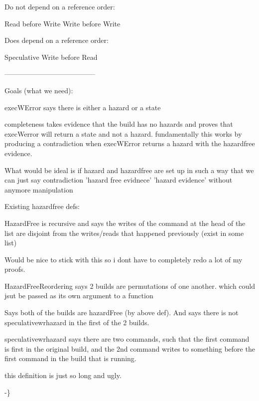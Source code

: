 \begin{code}[hide]
{Do not depend on a reference order:

   Read before Write
   Write before Write

Does depend on a reference order:
  
  Speculative Write before Read


---------------------------------------

Goals (what we need):

execWError says there is either a hazard or a state

completeness takes evidence that the build has no hazards and proves that execWerror will return 
a state and not a hazard.  fundamentally this works by producing a contradiction when execWError
returns a hazard with the hazardfree evidence. 

What would be ideal is if hazard and hazardfree are set up in such a way that we can just say
contradiction 'hazard free evidnece' 'hazard evidence' without anymore manipulation

Existing hazardfree defs:

HazardFree is recursive and says the writes of the command at the head of the list are disjoint from the writes/reads that happened previously (exist in some list)

Would be nice to stick with this so i dont have to completely redo a lot of my proofs.  

HazardFreeReordering says 2 builds are permutations of one another. which could jsut be passed as its own argument to a function

Says both of the builds are hazardFree (by above def). 
And says there is not speculativewrhazard in the first of the 2 builds.  

speculativewrhazard says there are two commands, such that the first command is first in the original build, and the 2nd command writes to something before the first command in the build that is running.

this definition is just so long and ugly.  

-\}}\<%
\\
\>[0]\AgdaSpace{}%
\AgdaSymbol{:}\AgdaSpace{}%
\<%
\\
\>[0]\AgdaSpace{}%
\AgdaSymbol{=}\AgdaSpace{}%
\AgdaSpace{}%
\<%
\end{code}

\newcommand{\fileinfo}{%
\begin{code}%
\>[0]\AgdaComment{-- FileNames == List FileName}\<%
\\
\>[0]\AgdaFunction{FileInfo}\AgdaSpace{}%
\AgdaSymbol{:}\AgdaSpace{}%
\AgdaPrimitiveType{Set}\<%
\\
\>[0]\AgdaFunction{FileInfo}\AgdaSpace{}%
\AgdaSymbol{=}\AgdaSpace{}%
\AgdaDatatype{List}\AgdaSpace{}%
\AgdaSymbol{(}\AgdaFunction{Cmd}\AgdaSpace{}%
\AgdaOperator{\AgdaFunction{×}}\AgdaSpace{}%
\AgdaFunction{FileNames}\AgdaSpace{}%
\AgdaOperator{\AgdaFunction{×}}\AgdaSpace{}%
\AgdaFunction{FileNames}\AgdaSymbol{)}\<%
\end{code}}


